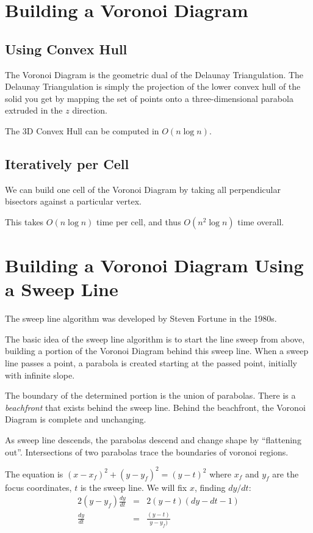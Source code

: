 \documentclass{article}
\begin{document}
\section{Building a Voronoi Diagram}

\subsection{Using Convex Hull}

The Voronoi Diagram is the geometric dual of the Delaunay
Triangulation.  The Delaunay Triangulation is simply the projection of
the lower convex hull of the solid you get by mapping the set of points onto a three-dimensional parabola extruded in the $z$ direction.

The 3D Convex Hull can be computed in $O(n \log n)$.

\subsection{Iteratively per Cell}
We can build one cell of the Voronoi Diagram by taking all perpendicular bisectors against a particular vertex.

This takes $O(n \log n)$ time per cell, and thus $O(n^2 \log n)$ time overall.

\section{Building a Voronoi Diagram Using a Sweep Line}
The sweep line algorithm was developed by Steven Fortune in the 1980s.

The basic idea of the sweep line algorithm is to start the line sweep from above, 
building a portion of the Voronoi Diagram behind this sweep line. When a
sweep line passes a point, a parabola is created starting at the
passed point, initially with infinite slope.

The boundary of the determined portion is the union of parabolas.
There is a \emph{beachfront} that exists behind the sweep line. Behind the beachfront,
the Voronoi Diagram is complete and unchanging.

As sweep line descends, the parabolas descend and change shape by
``flattening out''. Intersections of two parabolas trace the boundaries of voronoi regions.

The equation is $(x- x_f)^2 + (y - y_f)^2 = (y - t)^2$
where $x_f$ and $y_f$ are the focus coordinates, $t$ is the sweep line.
We will fix $x$, finding $dy/dt$:
\begin{eqnarray}
2(y - y_f) \frac{dy}{dt} &=& 2(y - t) (dy-dt - 1)\nonumber\\
\frac{dy}{dt} &=& \frac{(y - t)}{y - y_f)}\nonumber
\end{eqnarray}
\end{document}
